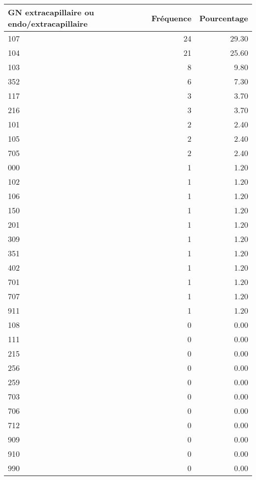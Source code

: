 \documentclass[11pt,a4paper]{article}\usepackage[]{graphicx}\usepackage[]{color}
\begin{document}
\begin{table}[H]
\centering
\begin{tabular}{lrr}
  \hline
GN extracapillaire ou endo/extracapillaire & Fréquence & Pourcentage \\ 
  \hline
107 &  24 & 29.30 \\ 
  104 &  21 & 25.60 \\ 
  103 &   8 & 9.80 \\ 
  352 &   6 & 7.30 \\ 
  117 &   3 & 3.70 \\ 
  216 &   3 & 3.70 \\ 
  101 &   2 & 2.40 \\ 
  105 &   2 & 2.40 \\ 
  705 &   2 & 2.40 \\ 
  000 &   1 & 1.20 \\ 
  102 &   1 & 1.20 \\ 
  106 &   1 & 1.20 \\ 
  150 &   1 & 1.20 \\ 
  201 &   1 & 1.20 \\ 
  309 &   1 & 1.20 \\ 
  351 &   1 & 1.20 \\ 
  402 &   1 & 1.20 \\ 
  701 &   1 & 1.20 \\ 
  707 &   1 & 1.20 \\ 
  911 &   1 & 1.20 \\ 
  108 &   0 & 0.00 \\ 
  111 &   0 & 0.00 \\ 
  215 &   0 & 0.00 \\ 
  256 &   0 & 0.00 \\ 
  259 &   0 & 0.00 \\ 
  703 &   0 & 0.00 \\ 
  706 &   0 & 0.00 \\ 
  712 &   0 & 0.00 \\ 
  909 &   0 & 0.00 \\ 
  910 &   0 & 0.00 \\ 
  990 &   0 & 0.00 \\ 
   \hline
\end{tabular}
\end{table}
\end{document}
